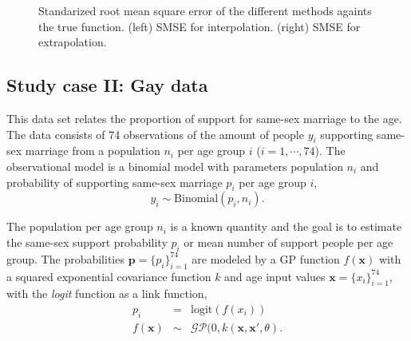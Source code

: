 \documentclass[]{interact}
\theoremstyle{plain}%
\theoremstyle{definition}
\theoremstyle{remark}
\begin{document}
\begin{figure}
\caption{Standarized root mean square error of the different methods againts the true function. (left) SMSE for interpolation. (right) SMSE for extrapolation.}
  \label{fig11_MSE_exI_inter}
\end{figure}

\subsection{Study case II: Gay data}
This data set relates the proportion of support for same-sex marriage to the age. The data consists of 74 observations of the amount of people $y_i$ supporting same-sex marriage from a population $n_i$ per age group $i$ ($i=1,\cdots,74$). The observational model is a binomial model with parameters population $n_i$ and probability of supporting same-sex marriage $p_i$ per age group $i$,
%
\begin{equation*}
y_i \sim \text{Binomial}(p_i, n_i).
\end{equation*}

\noindent The population per age group $n_i$ is a known quantity and the goal is to estimate the same-sex support probability $p_i$ or mean number of support people per age group. The probabilities $\bm{p}=\{p_i\}_{i=1}^{74}$ are modeled by a GP function $f(\bm{x})$ with a squared exponential covariance function $k$ and age input values $\bm{x}=\{x_i\}_{i=1}^{74}$, with the {\it logit} function as a link function,
%
\begin{eqnarray*} \label{eq:gpprior_gay}
p_i &=& \text{logit}(f(x_i)) \nonumber \\
f(\bm{x}) &\sim& \mathcal{GP}(0, k(\bm{x},\bm{x}', \theta).
\end{eqnarray*}
\end{document}
